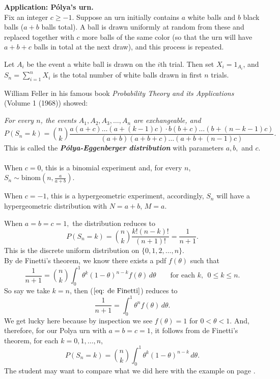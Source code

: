 \documentclass[12pt]{article}
\begin{document}
\newpage



\noindent \textbf{Application: P\'{o}lya's urn.}\label{polyaurn} \\
Fix an integer $c\ge -1$.  Suppose an urn initially contains $a$ white balls and $b$ black balls
($a+b$ balls total).  A ball is drawn uniformly at random from these and replaced together with $c$ more balls of the same color (so that the urn will have $a + b + c$ balls in total at the next draw), and this process is repeated.

Let $A_i$ be the event a white ball is drawn on the $i$th trial. Then set
$X_i = 1_{A_i}$,
and
$S_n = \sum_{i = 1}^n X_i$
is the total number of white balls drawn in first $n$ trials.

 William Feller in his famous book {\em Probability Theory and its Applications} (Volume 1 (1968)) showed:

{\em For every $n$, the events
$A_1, A_2, A_3, \dots, A_n$
are exchangeable, and}
$$P(S_n = k) = \binom{n}{k} \frac{a(a+c)\ldots(a+(k-1)c)\cdot b(b+c)\dots(b+(n-k-1)c)}{(a+b)(a+b+c)\dots(a+b+(n-1)c)}.$$
This is called the {\bf\em P\'{o}lya-Eggenberger distribution} with parameters $a, b, $ and $c$.\label{polyaeggenberger}\\

\\
\noindent When $c = 0$, this is a binomial experiment and, for every $n$, $S_n\sim \mbox{binom}\left(n, \frac{a}{a+b}\right)$.

\noindent When $c = -1$, this is a hypergeometric experiment, accordingly, $S_n$ will have a hypergeometric distribution with $N=a+b$, $M=a$.

\noindent When $a = b = c = 1,$ the distribution reduces to
$$P(S_n = k) = \binom{n}{k} \frac{k!(n-k)!}{(n+1)!} = \frac{1}{n+1}.$$
This is the discrete uniform\label{discreteuniform3} distribution on $\{0, 1, 2, \dots, n\}.$ \\
By de Finetti's theorem, we know there exists a pdf $f(\theta)$ such that
\begin{equation}
    \frac{1}{n+1} = \binom{n}{k} \int_0^1 \theta^k (1 - \theta)^{n-k} f(\theta) \,d\theta \quad\quad \text{for each }k,~~ 0 \leq k \leq n. \label{eq: de Finetti}
\end{equation}
So say we take $k = n$, then ($\ref{eq: de Finetti}$) reduces to
$$\frac{1}{n+1} = \int_0^1 \theta^n f(\theta) \,d\theta.$$
We get lucky here because by inspection we see $f(\theta) = 1$ for $0 < \theta < 1$. And, therefore, for our Polya urn with $a = b = c = 1$, it follows from de Finetti's theorem, for each $k = 0, 1, \dots, n$,
$$P(S_n = k) = \binom{n}{k} \int_0^1 \theta^k(1-\theta)^{n-k} \,d\theta.$$
The student may want to compare what we did here with the example on page \pageref{betabinomialexample}.\\
\end{document}
